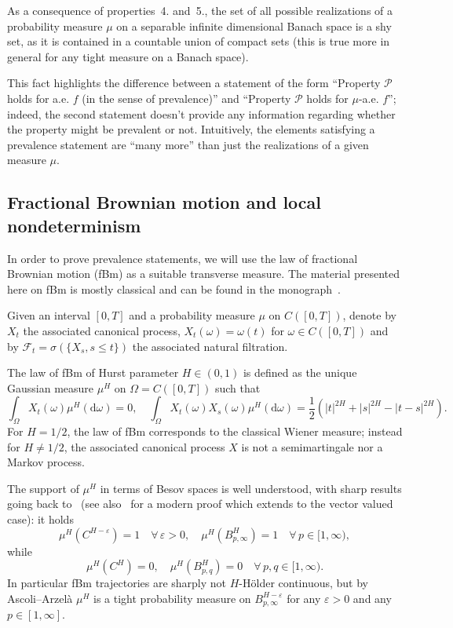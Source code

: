 \documentclass[11pt,oneside,reqno]{amsart}
\newcommand{\mathd}{\mathrm{d}}
\numberwithin{equation}{section}
\begin{document}
As a consequence of properties~4. and~5., the set of all possible realizations
of a probability measure $\mu$ on a separable infinite dimensional Banach
space is a shy set, as it is contained in a countable union of compact sets
(this is true more in general for any tight measure on a Banach space).

This fact highlights the difference between a statement of the form ``Property
$\mathcal{P}$ holds for a.e. $f$ (in the sense of prevalence)'' and ``Property
$\mathcal{P}$ holds for $\mu$-a.e. $f$''; indeed, the second statement doesn't
provide any information regarding whether the property might be prevalent or
not. Intuitively, the elements satisfying a prevalence statement are ``many
more'' than just the realizations of a given measure $\mu$.

\subsection{Fractional Brownian motion and local
nondeterminism}\label{sec:fbm}

In order to prove prevalence statements, we will use the law of fractional
Brownian motion (fBm) as a suitable transverse measure. The material presented
here on fBm is mostly classical and can be found in the
monograph~{\cite{nualart}}.

Given an interval $[0, T]$ and a probability measure $\mu$ on $C ([0, T])$,
denote by $X_t$ the associated canonical process, $X_t (\omega) = \omega (t)$
for $\omega \in C ([0, T])$ and by $\mathcal{F}_t = \sigma (\{ X_s, s
\leqslant t \})$ the associated natural filtration.

The law of fBm of Hurst parameter $H \in (0, 1)$ is defined as the unique
Gaussian measure $\mu^H$ on $\Omega = C ([0, T])$ such that
\[ \int_{\Omega} X_t (\omega) \mu^H (\mathd \omega) = 0, \quad \int_{\Omega}
   X_t (\omega) X_s (\omega) \mu^H (\mathd \omega) = \frac{1}{2} (| t |^{2 H}
   + | s |^{2 H} - | t - s |^{2 H}) . \]
For $H = 1 / 2$, the law of fBm corresponds to the classical Wiener measure;
instead for $H \neq 1 / 2$, the associated canonical process $X$ is not a
semimartingale nor a Markov process.

The support of $\mu^H$ in terms of Besov spaces is well understood, with sharp
results going back to~{\cite{ciesielski1993}} (see also~{\cite{veraar2009}}
for a modern proof which extends to the vector valued case): it holds
\[ \mu^H (C^{H - \varepsilon}) = 1 \quad \forall \, \varepsilon > 0, \quad
   \mu^H (B^H_{p, \infty}) = 1 \quad \forall \, p \in [1, \infty), \]
while
\[ \mu^H (C^H) = 0, \quad \mu^H (B^H_{p, q}) = 0 \quad \forall \, p, q \in [1,
   \infty) . \]
In particular fBm trajectories are sharply not $H$-H\"{o}lder continuous, but
by Ascoli--Arzel{\`a} $\mu^H$ is a tight probability measure on $B^{H -
\varepsilon}_{p, \infty}$ for any $\varepsilon > 0$ and any $p \in [1,
\infty]$.
\end{document}
